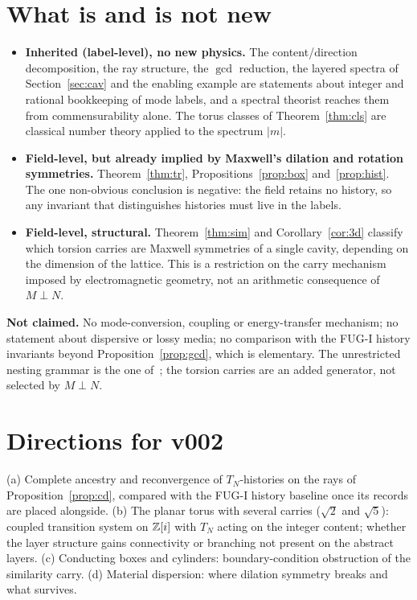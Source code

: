 \documentclass[11pt,a4paper]{article}
\theoremstyle{definition}
\theoremstyle{remark}
\begin{document}
\section{What is and is not new}
\begin{itemize}
\item \textbf{Inherited (label-level), no new physics.} The content/direction decomposition, the ray structure, the $\gcd$ reduction, the layered spectra of Section~\ref{sec:cav} and the enabling example are statements about integer and rational bookkeeping of mode labels, and a spectral theorist reaches them from commensurability alone. The torus classes of Theorem~\ref{thm:cls} are classical number theory applied to the spectrum $|m|$.
\item \textbf{Field-level, but already implied by Maxwell's dilation and rotation symmetries.} Theorem~\ref{thm:tr}, Propositions~\ref{prop:box} and~\ref{prop:hist}. The one non-obvious conclusion is negative: the field retains no history, so any invariant that distinguishes histories must live in the labels.
\item \textbf{Field-level, structural.} Theorem~\ref{thm:sim} and Corollary~\ref{cor:3d} classify which torsion carries are Maxwell symmetries of a single cavity, depending on the dimension of the lattice. This is a restriction on the carry mechanism imposed by electromagnetic geometry, not an arithmetic consequence of $M\perp N$.
\end{itemize}
\textbf{Not claimed.} No mode-conversion, coupling or energy-transfer mechanism; no statement about dispersive or lossy media; no comparison with the FUG-I history invariants beyond Proposition~\ref{prop:gcd}, which is elementary. The unrestricted nesting grammar is the one of~\cite{MX}; the torsion carries are an added generator, not selected by $M\perp N$.

\section{Directions for v002}
(a) Complete ancestry and reconvergence of $T_N$-histories on the rays of Proposition~\ref{prop:cd}, compared with the FUG-I history baseline once its records are placed alongside. (b) The planar torus with several carries ($\sqrt2$ and $\sqrt5$): coupled transition system on $\mathbb Z[i]$ with $T_N$ acting on the integer content; whether the layer structure gains connectivity or branching not present on the abstract layers. (c) Conducting boxes and cylinders: boundary-condition obstruction of the similarity carry. (d) Material dispersion: where dilation symmetry breaks and what survives.
\end{document}

